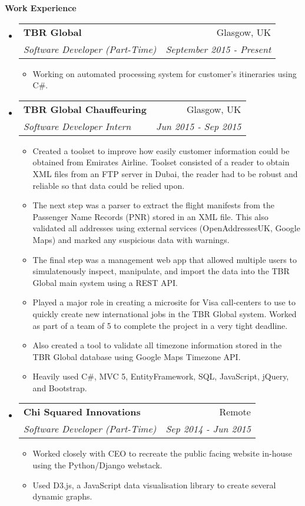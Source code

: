 \documentclass[letterpaper,11pt]{article}
\makeatletter
\newcommand{\resitem}[1]{\item #1 \vspace{-2pt}}
\newcommand{\resheading}[1]{{\large \colorbox{mygrey}{\begin{minipage}{\textwidth}{\textbf{#1 \vphantom{p\^{E}}}}\end{minipage}}}}
\newcommand{\ressubheading}[4]{
\begin{tabular*}{7.0in}{l@{\extracolsep{\fill}}r}
		\textbf{#1} & #2 \\
		\textit{#3} & \textit{#4} \\
\end{tabular*}\vspace{-6pt}}
\makeatother
\begin{document}
\resheading{Work Experience}
\begin{itemize}
\item
	\ressubheading{TBR Global}{Glasgow, UK}{Software Developer (Part-Time)}{September 2015 - Present}
	\begin{itemize}
		\resitem{Working on automated processing system for customer's itineraries using C\#.}
	\end{itemize}

\item
	\ressubheading{TBR Global Chauffeuring}{Glasgow, UK}{Software Developer Intern}{Jun 2015 - Sep 2015}
	\begin{itemize}
		\resitem{Created a toolset to improve how easily customer information could be obtained from Emirates Airline.
		Toolset consisted of a reader to obtain XML files from an FTP server in Dubai, the reader had to be robust and reliable so that data could be relied upon.}
		\resitem {The next step was a parser to extract the flight manifests from the Passenger Name Records (PNR) stored in an XML file. This also validated all addresses using external services (OpenAddressesUK, Google Maps) and marked any suspicious data with warnings.}
		\resitem {The final step was a management web app that allowed multiple users to simulatenously inspect, manipulate, and import the data into the TBR Global main system using a REST API.}
		\resitem {Played a major role in creating a microsite for Visa call-centers to use to quickly create new international jobs in the TBR Global system. Worked as part of a team of 5 to complete the project in a very tight deadline.}
		\resitem {Also created a tool to validate all timezone information stored in the TBR Global database using Google Maps Timezone API.}
		\resitem {Heavily used C\#, MVC 5, EntityFramework, SQL, JavaScript, jQuery, and Bootstrap.}
	\end{itemize}

\item
	\ressubheading{Chi Squared Innovations}{Remote}{Software Developer (Part-Time)}{Sep 2014 - Jun 2015}
	\begin{itemize}
		\resitem {Worked closely with CEO to recreate the public facing website in-house using the Python/Django webstack.}
		\resitem {Used D3.js, a JavaScript data visualisation library to create several dynamic graphs.}
	\end{itemize}

\end{itemize}

\pagebreak
\end{document}
